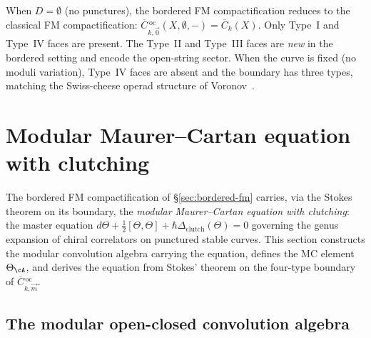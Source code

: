 \begin{remark}
\label{rem:comparison-classical-fm}
When $D = \emptyset$ (no punctures), the bordered FM
compactification reduces to the classical FM compactification:
$\overline{C}{}^{\,\mathrm{oc}}_{k,\vec{0}}(X, \emptyset, -)
= \overline{C}_k(X)$.
Only Type~I and Type~IV faces are present.  The Type~II and
Type~III faces are \emph{new} in the bordered setting and encode
the open-string sector.  When the curve is fixed
(no moduli variation), Type~IV faces are absent and the boundary
has three types, matching the Swiss-cheese operad structure
of Voronov~\cite{Voronov99}.
\end{remark}


\section{Modular Maurer--Cartan equation with clutching}
\label{sec:modular-mc-clutching}

The bordered FM compactification of
\S\ref{sec:bordered-fm} carries, via the Stokes theorem on
its boundary, the \emph{modular Maurer--Cartan equation with
clutching}: the master equation
$d\Theta + \tfrac{1}{2}[\Theta, \Theta]
+ \hbar\Delta_{\mathrm{clutch}}(\Theta) = 0$
governing the genus expansion of chiral correlators on
punctured stable curves.  This section constructs the modular
convolution algebra carrying the equation, defines the MC element
$\Theta_\cA$, and derives the equation from Stokes' theorem on
the four-type boundary of
$\overline{C}{}^{\,\mathrm{oc}}_{k,\vec{m}}$.

\subsection{The modular open-closed convolution algebra}
\label{subsec:modular-oc-convolution}

